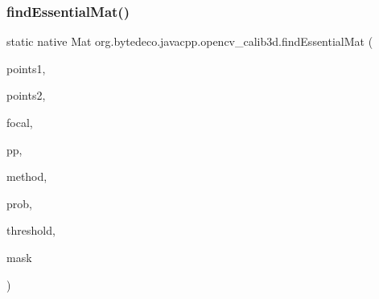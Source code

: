 \subsubsection{\texorpdfstring{find\+Essential\+Mat()}{findEssentialMat()}\hspace{0.1cm}{\footnotesize\ttfamily [2/2]}}
{\footnotesize\ttfamily static native Mat org.\+bytedeco.\+javacpp.\+opencv\+\_\+calib3d.\+find\+Essential\+Mat (\begin{DoxyParamCaption}\item[{@By\+Val Mat}]{points1,  }\item[{@By\+Val Mat}]{points2,  }\item[{double}]{focal,  }\item[{@By\+Val(null\+Value=\char`\"{}cv\+::\+Point2d(0, 0)\char`\"{}) Point2d}]{pp,  }\item[{int}]{method,  }\item[{double}]{prob,  }\item[{double}]{threshold,  }\item[{@By\+Val(null\+Value=\char`\"{}cv\+::\+Output\+Array(cv\+::no\+Array())\char`\"{}) Mat}]{mask }\end{DoxyParamCaption})\hspace{0.3cm}{\ttfamily [static]}}

